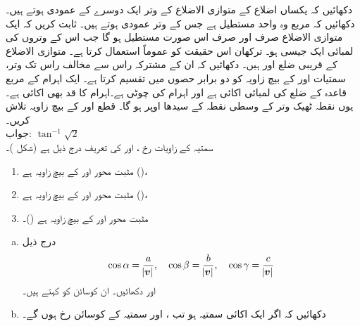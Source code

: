 دکھائیں کہ یکساں اضلاع کے متوازی الاضلاع کے وتر ایک دوسرے کے عمودی ہوتے ہیں۔ 
دکھائیں کہ مربع وہ واحد مستطیل ہے جس کے وتر عمودی ہوتے ہیں۔
ثابت کریں کہ ایک متوازی الاضلاع صرف اور صرف اس صورت مستطیل ہو گا جب اس کے وتروں  کی لمبائی ایک جیسی ہو۔ ترکھان اس حقیقت کو عموماً استعمال کرتا ہے۔
متوازی الاضلاع کے قریبی ضلع  اور  ہیں۔ دکھائیں کہ ان کے مشترکہ راس سے مخالف راس تک وتر، سمتیات   اور  کے بیچ زاویہ کو دو برابر حصوں میں تقسیم کرتا ہے۔ 
ایک اہرام کے مربع قاعدہ  کے ضلع  کی لمبائی  اکائی ہے  اور اہرام کی چوٹی  ہے۔اہرام کا قد بھی  اکائی ہے۔ یوں نقطہ   ٹھیک وتر  کے وسطی نقطہ کے سیدھا اوپر  ہو گا۔ قطع  اور  کے بیچ زاویہ تلاش کریں۔\\
جواب:\quad
$\tan^{-1}\sqrt{2}$
\\
سمتیہ  کے زاویات رخ ،  اور  کی تعریف درج ذیل ہے (شکل )۔
\begin{enumerate}[]
\item
مثبت محور  اور  کے بیچ زاویہ  ہے ()،
\item
مثبت محور  اور  کے بیچ زاویہ  ہے ()،
\item
مثبت محور  اور  کے بیچ زاویہ  ہے ()۔
\end{enumerate}
\begin{enumerate}[a.]
\item
درج ذیل
\begin{align*}
\cos\alpha=\frac{a}{\abs{{{\boldsymbol{v}}}}},\quad \cos\beta=\frac{b}{\abs{{{\boldsymbol{v}}}}},\quad \cos\gamma=\frac{c}{\abs{{{\boldsymbol{v}}}}}
\end{align*} 
اور  دکھائیں۔ ان کوسائن کو  کہتے ہیں۔
\item
{} دکھائیں کہ اگر  ایک اکائی سمتیہ ہو تب ،  اور  سمتیہ  کے کوسائن رخ ہوں گے۔
\end{enumerate}

